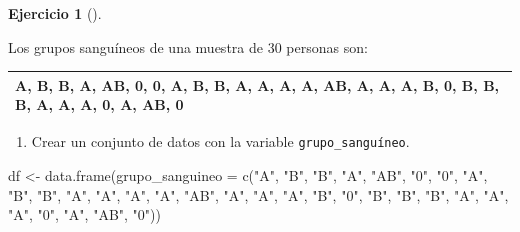 \documentclass[
  a4paper,
]{scrreport}
\newenvironment{Shaded}{\begin{snugshade}}{\end{snugshade}}
\newcommand{\AttributeTok}[1]{\textcolor[rgb]{0.40,0.45,0.13}{#1}}
\newcommand{\FunctionTok}[1]{\textcolor[rgb]{0.28,0.35,0.67}{#1}}
\newcommand{\NormalTok}[1]{\textcolor[rgb]{0.00,0.23,0.31}{#1}}
\newcommand{\OtherTok}[1]{\textcolor[rgb]{0.00,0.23,0.31}{#1}}
\newcommand{\StringTok}[1]{\textcolor[rgb]{0.13,0.47,0.30}{#1}}
\providecommand{\tightlist}{%
  \setlength{\itemsep}{0pt}\setlength{\parskip}{0pt}}\usepackage{longtable,booktabs,array}
\theoremstyle{definition}
\newtheorem{exercise}{Ejercicio}[chapter]
\theoremstyle{remark}
\begin{document}
\leavevmode{}%
\begin{exercise}[]\label{exr-3}

Los grupos sanguíneos de una muestra de 30 personas son:

\begin{longtable}[]{@{}
  >{\centering\arraybackslash}p{}@{}}
\toprule()
\endhead
A, B, B, A, AB, 0, 0, A, B, B, A, A, A, A, AB, A, A, A, B, 0, B, B, B,
A, A, A, 0, A, AB, 0 \\
\bottomrule()
\end{longtable}

\begin{enumerate}
\def\labelenumi{\alph{enumi}.}
\tightlist
\item
  Crear un conjunto de datos con la variable \texttt{grupo\_sanguíneo}.
\end{enumerate}

\begin{tcolorbox}[enhanced jigsaw, coltitle=black, breakable, bottomtitle=1mm, colbacktitle=quarto-callout-tip-color!10!white, rightrule=.15mm, opacityback=0, opacitybacktitle=0.6, left=2mm, colframe=quarto-callout-tip-color-frame, title=\textcolor{quarto-callout-tip-color}{\faLightbulb}\hspace{0.5em}{Solución}, toprule=.15mm, toptitle=1mm, arc=.35mm, colback=white, titlerule=0mm, bottomrule=.15mm, leftrule=.75mm]

\begin{Shaded}
\begin{Highlighting}[]
\NormalTok{df }\OtherTok{\textless{}{-}} \FunctionTok{data.frame}\NormalTok{(}\AttributeTok{grupo\_sanguineo =} \FunctionTok{c}\NormalTok{(}\StringTok{"A"}\NormalTok{, }\StringTok{"B"}\NormalTok{, }\StringTok{"B"}\NormalTok{, }\StringTok{"A"}\NormalTok{, }\StringTok{"AB"}\NormalTok{, }\StringTok{"0"}\NormalTok{, }\StringTok{"0"}\NormalTok{, }\StringTok{"A"}\NormalTok{, }\StringTok{"B"}\NormalTok{, }\StringTok{"B"}\NormalTok{, }\StringTok{"A"}\NormalTok{, }\StringTok{"A"}\NormalTok{, }\StringTok{"A"}\NormalTok{, }\StringTok{"A"}\NormalTok{, }\StringTok{"AB"}\NormalTok{, }\StringTok{"A"}\NormalTok{, }\StringTok{"A"}\NormalTok{, }\StringTok{"A"}\NormalTok{, }\StringTok{"B"}\NormalTok{, }\StringTok{"0"}\NormalTok{, }\StringTok{"B"}\NormalTok{, }\StringTok{"B"}\NormalTok{, }\StringTok{"B"}\NormalTok{, }\StringTok{"A"}\NormalTok{, }\StringTok{"A"}\NormalTok{, }\StringTok{"A"}\NormalTok{, }\StringTok{"0"}\NormalTok{, }\StringTok{"A"}\NormalTok{, }\StringTok{"AB"}\NormalTok{, }\StringTok{"0"}\NormalTok{))}
\end{Highlighting}
\end{Shaded}


\end{tcolorbox}
\end{exercise}
\end{document}
